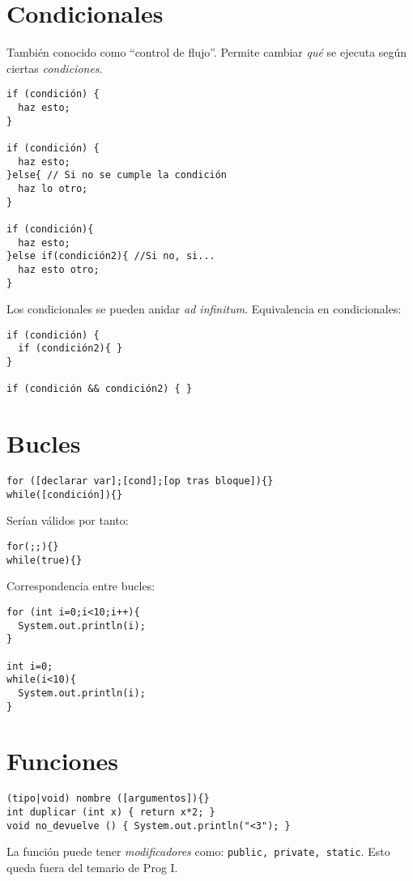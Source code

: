 \documentclass[10pt,twocolumn]{article}
\begin{document}
\vspace{-10}

\section{Condicionales}
\label{sec:condicionales}

También conocido como ``control de flujo''. Permite cambiar \emph{qué} se ejecuta según ciertas \emph{condiciones}.

\begin{verbatim}
if (condición) {
  haz esto;
}

if (condición) {
  haz esto;
}else{ // Si no se cumple la condición
  haz lo otro;
}

if (condición){
  haz esto;
}else if(condición2){ //Si no, si...
  haz esto otro;
}
\end{verbatim}
Los condicionales se pueden anidar \emph{ad infinitum}.
Equivalencia en condicionales:

\begin{verbatim}
if (condición) {
  if (condición2){ }
}

if (condición && condición2) { }
\end{verbatim}

\section{Bucles}
\label{sec:bucles}

\begin{verbatim}
for ([declarar var];[cond];[op tras bloque]){}
while([condición]){}
\end{verbatim}

Serían válidos por tanto:

\begin{verbatim}
for(;;){}
while(true){}
\end{verbatim}

Correspondencia entre bucles:
\begin{verbatim}
for (int i=0;i<10;i++){
  System.out.println(i);
}

int i=0;
while(i<10){
  System.out.println(i);
}
\end{verbatim}

\section{Funciones}
\label{sec:funciones}

\begin{verbatim}
(tipo|void) nombre ([argumentos]){}
int duplicar (int x) { return x*2; }
void no_devuelve () { System.out.println("<3"); }
\end{verbatim}
La función puede tener \emph{modificadores} como: \texttt{public, private, static}. Esto queda fuera del temario de Prog I.
\end{document}
